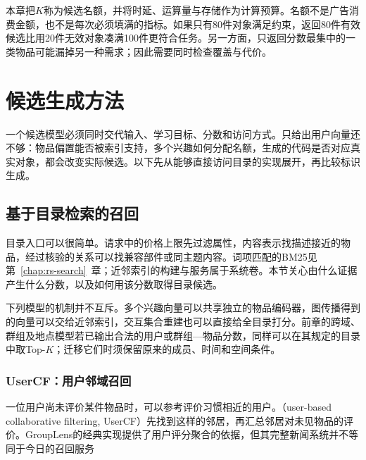 本章把$K$称为候选名额，并将时延、运算量与存储作为计算预算。名额不是广告消费金额，也不是每次必须填满的指标。如果只有80件对象满足约束，返回80件有效候选比用20件无效对象凑满100件更符合任务。另一方面，只返回分数最集中的一类物品可能漏掉另一种需求；因此需要同时检查覆盖与代价。

\section{候选生成方法}
\label{sec:rs-candidate-methods}

一个候选模型必须同时交代输入、学习目标、分数和访问方式。只给出用户向量还不够：物品偏置能否被索引支持，多个兴趣如何分配名额，生成的代码是否对应真实对象，都会改变实际候选。以下先从能够直接访问目录的实现展开，再比较标识生成。

\subsection{基于目录检索的召回}
\label{sec:rs-directory-retrieval}

目录入口可以很简单。请求中的价格上限先过滤属性，内容表示找描述接近的物品，经过核验的关系可以找兼容部件或同主题内容。词项匹配的BM25见第~\ref{chap:rs-search}~章；近邻索引的构建与服务属于系统卷。本节关心由什么证据产生什么分数，以及如何用该分数取得目录候选。

下列模型的机制并不互斥。多个兴趣向量可以共享独立的物品编码器，图传播得到的向量可以交给近邻索引，交互集合重建也可以直接给全目录打分。前章的跨域、群组及地点模型若已输出合法的用户或群组—物品分数，同样可以在其规定的目录中取Top-$K$；迁移它们时须保留原来的成员、时间和空间条件。

\subsubsection{UserCF：用户邻域召回}
\label{sec:rs-usercf}

一位用户尚未评价某件物品时，可以参考评价习惯相近的用户。（user-based collaborative filtering, UserCF）先找到这样的邻居，再汇总邻居对未见物品的评价。GroupLens的经典实现提供了用户评分聚合的依据，但其完整新闻系统并不等同于今日的召回服务

